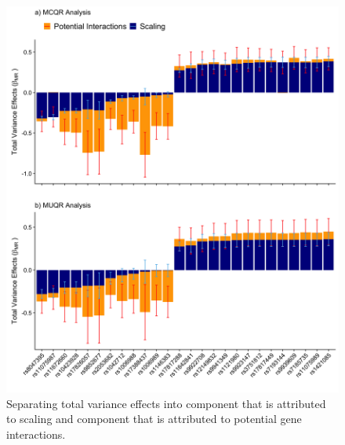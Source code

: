 \documentclass[12pt]{article}
\begin{document}
\begin{figure}[h!]
	\centering
	\includegraphics[width=1\textwidth, height=1\textwidth]{Figures/Interaction_vs_Scaling_Variance_Effects.png}
	\caption{Separating total variance effects into component that is attributed to scaling and component that is attributed to potential gene interactions.}
	\label{fig:Interaction_vs_ScalingEffectsSelectSNPs}
\end{figure}
\end{document}
